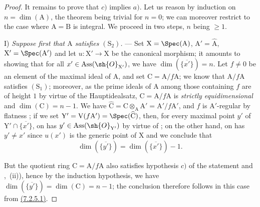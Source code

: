 \begin{proof}

It remains to prove that $c)$ implies $a)$.
Let us reason by induction on $n=\dim(\mathrm{A})$, the theorem being trivial for $n=0$; we can moreover restrict to the case where $\mathrm{A}=\mathrm{B}$ is integral.
We proceed in two steps, $n$ being $\geqslant 1$.

\medskip\noindent
I) \emph{Suppose first that $\mathrm{A}$ satisfies $(\mathrm{S}_2)$.} ---
Set $\mathrm{X}=\Spec(\mathrm{A})$, $\mathrm{A}'=\widehat{\mathrm{A}}$, $\mathrm{X}'=\Spec(\mathrm{A}')$ and let $u:\mathrm{X}'\to\mathrm{X}$ be the canonical morphism; it amounts to showing that for all $x'\in\operatorname{Ass}(\sh{O}_{\mathrm{X}'})$, we have $\dim(\overline{\{x'\}})=n$.
Let $f\neq 0$ be an element of the maximal ideal of $\mathrm{A}$, and set $\mathrm{C}=\mathrm{A}/f\mathrm{A}$; we know  that $\mathrm{A}/f\mathrm{A}$ satisfies $(\mathrm{S}_1)$; moreover, as the prime ideals of $\mathrm{A}$ among those containing $f$ are of height $1$ by virtue of the Hauptidealsatz, $\mathrm{C}=\mathrm{A}/f\mathrm{A}$ is \emph{strictly equidimensional} and $\dim(\mathrm{C})=n-1$.
We have $\widehat{\mathrm{C}}=\mathrm{C}\otimes_\mathrm{A}\mathrm{A}'=\mathrm{A}'/f\mathrm{A}'$, and $f$ is $\mathrm{A}'$-regular by flatness ; if we set $\mathrm{Y}'=\mathrm{V}(f\mathrm{A}')=\Spec(\widehat{\mathrm{C}})$, then, for every maximal point $y'$ of $\mathrm{Y}'\cap\overline{\{x'\}}$, on has $y'\in\operatorname{Ass}(\sh{O}_{\mathrm{Y}'})$ by virtue of ; on the other hand, on has $y'\neq x'$ since $u(x')$ is the generic point of $\mathrm{X}$  and we conclude  that
\[
  \dim(\overline{\{y'\}})=\dim(\overline{\{x'\}})-1.
  \tag{7.2.5.1}
\]

But the quotient ring $\mathrm{C}=\mathrm{A}/f\mathrm{A}$ also satisfies hypothesis $c)$ of the statement  and ,~(ii)), hence by the induction hypothesis, we have $\dim(\overline{\{y'\}})=\dim(\mathrm{C})=n-1$; the conclusion therefore follows in this case from \hyperref[IV.7.2.5.1]{(7.2.5.1)}.


\end{proof}
